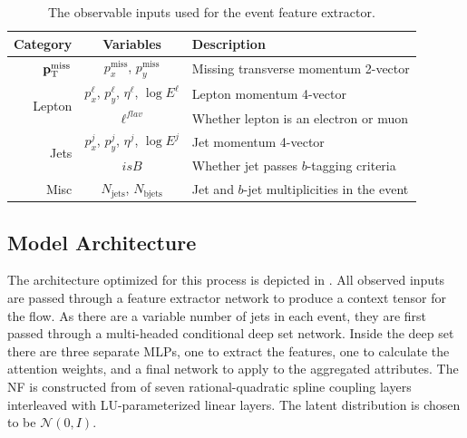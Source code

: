 \begin{table}[ht]
    \caption{The observable inputs used for the event feature extractor.}
    \label{tab:inputs}
    \centering
    \begin{tabular}{r c l}
        \toprule
        Category                & Variables                                              & Description                                 \\
        \midrule
        $\mathbf{p}_\mathrm{T}^{\mathrm{miss}}$               & $p_x^\text{miss}$, $p_y^\text{miss}$                   & Missing transverse momentum 2-vector        \\ [2ex]
        \multirow{2}{*}{Lepton} & $p_x^{\ell}$, $p_y^{\ell}$, $\eta^\ell$, $\log E^\ell$ & Lepton momentum 4-vector                    \\
                                & $\ell^{flav}$                                          & Whether lepton is an electron or muon       \\ [2ex]
        \multirow{2}{*}{Jets}   & $p_x^{j}$, $p_y^j$, $\eta^j$,  $\log E^j$              & Jet momentum 4-vector                       \\
                                & $isB$                                                  & Whether jet passes $b$-tagging criteria     \\ [2ex]
        Misc                    & $N_{\text{jets}}$, $N_{\text{bjets}}$                  & Jet and $b$-jet multiplicities in the event \\
        \bottomrule
    \end{tabular}
\end{table}

\subsection{Model Architecture}

The \vflows architecture optimized for this process is depicted in .
All observed inputs are passed through a feature extractor network to produce a context tensor for the flow.
As there are a variable number of jets in each event, they are first passed through a multi-headed conditional deep set network.
Inside the deep set there are three separate MLPs, one to extract the features, one to calculate the attention weights, and a final network to apply to the aggregated attributes.
The NF is constructed from of seven rational-quadratic spline coupling layers~\cite{NeuralSplineFlows} interleaved with LU-parameterized linear layers.
The latent distribution is chosen to be $\mathcal{N}(0, I)$.

